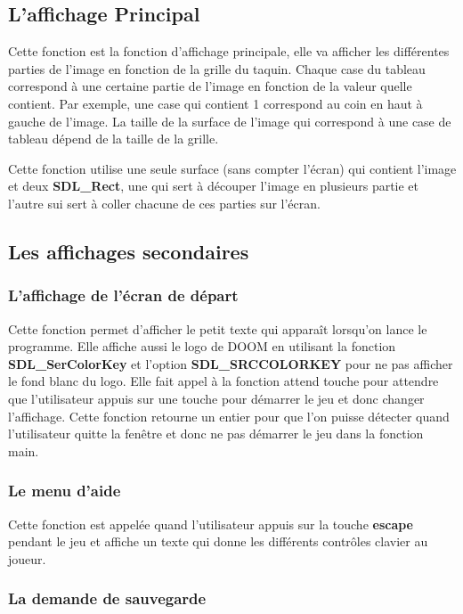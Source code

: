 \documentclass[a4paper]{article}
\begin{document}
\subsection{L'affichage Principal}

Cette fonction est la fonction d'affichage principale, elle va afficher les
différentes parties de l'image en fonction de la grille du taquin. Chaque case du
tableau correspond à une certaine partie de l'image en fonction de la valeur
quelle contient. Par exemple, une case qui contient 1 correspond au coin en haut
à gauche de l'image. La taille de la surface de l'image qui correspond à une
case de tableau dépend de la taille de la grille.

Cette fonction utilise une seule surface (sans compter l'écran) qui contient
l'image et deux \textbf{SDL\_Rect}, une  qui sert à découper l'image en plusieurs
partie et l'autre sui sert à coller chacune de ces parties sur l'écran.

\subsection{Les affichages secondaires}
\subsubsection{L'affichage de l'écran de départ}

Cette fonction permet d'afficher le petit texte qui apparaît lorsqu'on lance le
programme. Elle affiche aussi le logo de DOOM en utilisant la fonction
\textbf{SDL\_SerColorKey} et l'option \textbf{SDL\_SRCCOLORKEY} pour ne pas
afficher le fond blanc du logo. Elle fait appel à la fonction attend touche pour
attendre que l'utilisateur appuis sur une touche pour démarrer le jeu et donc
changer l'affichage. Cette fonction retourne un entier pour que l'on puisse
détecter quand l'utilisateur quitte la fenêtre et donc ne pas démarrer le jeu dans
la fonction main.

\subsubsection{Le menu d'aide}

Cette fonction est appelée quand l'utilisateur appuis sur la touche \textbf{escape}
pendant le jeu et affiche un texte qui donne les différents contrôles clavier au
joueur.

\subsubsection{La demande de sauvegarde}
\end{document}
